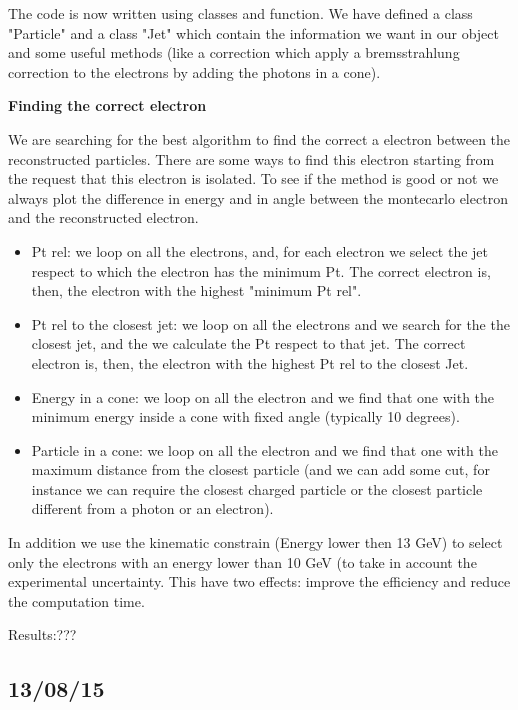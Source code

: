 The code is now written using classes and function.
We have defined a class "Particle" and a class "Jet" which contain the information we want in our object and some useful methods (like a correction which apply a bremsstrahlung correction to the electrons by adding the photons in a cone).

\textbf{Finding the correct electron}

We are searching for the best algorithm to find the correct a electron between the reconstructed particles. There are some ways to find this electron starting from the request that this electron is isolated. To see if the method is good or not we always plot the difference in energy and in angle between the montecarlo electron and the reconstructed electron.

\begin{itemize}
\item Pt rel: we loop on all the electrons, and, for each electron we select the jet respect to which the electron has the minimum Pt. The correct electron is, then, the electron with the highest "minimum Pt rel".\\
\item Pt rel to the closest jet: we loop on all the electrons and we search for the the closest jet, and the we calculate the Pt respect to that jet. The correct electron is, then, the electron with the highest Pt rel to the closest Jet.\\
\item Energy in a cone: we loop on all the electron and we find that one with the minimum energy inside a cone with fixed angle (typically 10 degrees).\\
\item Particle in a cone: we loop on all the electron and we find that one with the maximum distance from the closest particle (and we can add some cut, for instance we can require the closest charged particle or the closest particle different from a photon or an electron).
\end{itemize} 

In addition we use the kinematic constrain (Energy lower then 13 GeV) to select only the electrons with an energy lower than 10 GeV (to take in account the experimental uncertainty. This have two effects: improve the efficiency and reduce the computation time.

Results:???

\subsection{13/08/15}

